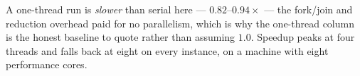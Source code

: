 \documentclass[twocolumn]{article}
\begin{document}
    A one-thread run is \emph{slower} than serial here --- $0.82$--$0.94\times$ --- the
    fork/join and reduction overhead paid for no parallelism, which is why the one-thread
    column is the honest baseline to quote rather than assuming $1.0$. Speedup peaks at
    four threads and falls back at eight on every instance, on a machine with eight
    performance cores.

%
%    
%    
\end{document}
